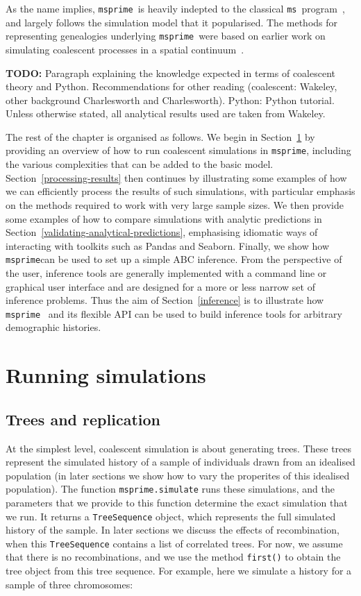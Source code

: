 \documentclass[graybox]{svmult}
\newcommand{\msprime}[0]{\texttt{msprime}}
\newcommand{\ms}[0]{\texttt{ms}}
\begin{document}
As the name implies, \msprime\ is heavily indepted to the classical
\ms\ program~\citep{hudson2002generating}, and largely follows the
simulation model that it popularised. The methods for representing
genealogies underlying \msprime\ were based on earlier work on simulating coalescent
processes in a spatial
continuum~\citep{kelleher2013coalescent,kelleher2014coalescent}.

\textbf{TODO:} Paragraph explaining the knowledge expected
in terms of coalescent theory and Python. Recommendations 
for other reading (coalescent: Wakeley, other background 
Charlesworth and Charlesworth). Python: Python tutorial. Unless otherwise
stated, all analytical results used are taken from Wakeley.

The rest of the chapter is organised as follows. We begin in
Section~\ref{running-simulations} by providing an overview of how
to run coalescent simulations in \msprime, including the various
complexities that can be added to the basic model.
Section~\ref{processing-results} then continues by illustrating
some examples of how we can efficiently process the results
of such simulations, with particular emphasis on the methods
required to work with very large sample sizes. We then provide
some examples of how to compare simulations with analytic
predictions in Section~\ref{validating-analytical-predictions},
emphasising idiomatic ways of interacting with toolkits such as
Pandas and Seaborn. Finally, we show how \msprime can be
used to set up a simple ABC inference. From the perspective of the user,
inference tools are generally implemented with a command line or graphical 
user interface and are designed for a more or less narrow set of inference
problems. Thus the aim of Section~\ref{inference} is to illustrate how
\msprime~\citep{kelleher2016efficient} and its flexible API can be used to build inference tools for arbitrary demographic histories.

\section{Running simulations}
\label{running-simulations}

\subsection{Trees and replication}
    At the simplest level, coalescent simulation is about generating trees.
These trees represent the simulated history of a sample of individuals
drawn from an idealised population (in later sections we show how to
vary the properites of this idealised population). The function
\texttt{msprime.simulate} runs these simulations, and the parameters
that we provide to this function determine the exact simulation that we
run. It returns a \texttt{TreeSequence} object, which represents the
full simulated history of the sample. In later sections we discuss the
effects of recombination, when this \texttt{TreeSequence} contains a
list of correlated trees. For now, we assume that there is no
recombinations, and we use the method \texttt{first()} to obtain the
tree object from this tree sequence. For example, here we simulate a
history for a sample of three chromosomes:
\end{document}
